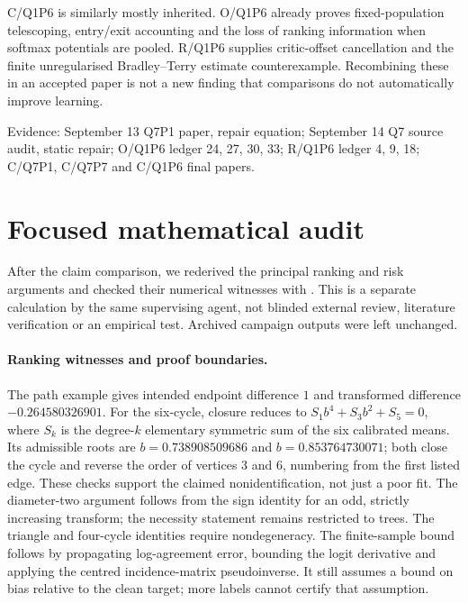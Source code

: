 \documentclass[11pt,a4paper]{article}
\newcommand{\ev}[1]{{\small\textsf{Evidence:} #1}}
\begin{document}
C/Q1P6 is similarly mostly inherited. O/Q1P6 already proves fixed-population
telescoping, entry/exit accounting and the loss of ranking information when
softmax potentials are pooled. R/Q1P6 supplies critic-offset cancellation and
the finite unregularised Bradley--Terry estimate counterexample. Recombining
these in an accepted paper is not a new finding that comparisons do not
automatically improve learning.

\ev{September 13 Q7P1 paper, repair equation;
September 14 Q7 source audit, static repair;
O/Q1P6 ledger 24, 27, 30, 33; R/Q1P6 ledger 4, 9, 18;
C/Q7P1, C/Q7P7 and C/Q1P6 final papers.}

\section{Focused mathematical audit}

After the claim comparison, we rederived the principal ranking and risk
arguments and checked their numerical witnesses with
. This is a separate calculation by
the same supervising agent, not blinded external review, literature
verification or an empirical test. Archived campaign outputs were left
unchanged.

\paragraph{Ranking witnesses and proof boundaries.}
The path example gives intended endpoint difference $1$ and transformed
difference $-0.264580326901$. For the six-cycle, closure reduces to
$S_1b^4+S_3b^2+S_5=0$, where $S_k$ is the degree-$k$ elementary symmetric
sum of the six calibrated means. Its admissible roots are
$b=0.738908509686$ and $b=0.853764730071$; both close the cycle and reverse
the order of vertices 3 and 6, numbering from the first listed edge.
These checks support the claimed nonidentification, not just a poor fit.
The diameter-two argument follows from the sign identity for an odd,
strictly increasing transform; the necessity statement remains restricted
to trees. The triangle and four-cycle identities require nondegeneracy.
The finite-sample bound follows by propagating log-agreement error,
bounding the logit derivative and applying the centred incidence-matrix
pseudoinverse. It still assumes a bound on bias relative to the clean
target; more labels cannot certify that assumption.
\end{document}
